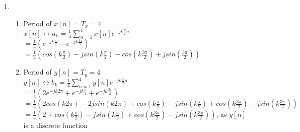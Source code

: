 \documentclass[10pt,a4paper, margin=1in]{article}
\begin{document}
\begin{enumerate}
\item %
    \begin{enumerate}
    \item %
    Period of $x[n] = T_x = 4$ \vspace{0.2cm}\\
    $x[n] \longleftrightarrow a_k = \frac{1}{4}\sum^4_{n=1}x[n]e^{-jk\frac{\pi}{2}n}$ \vspace{0.2cm}\\
    \hspace*{1.9cm}$=\frac{1}{4}(e^{-jk\frac{\pi}{2}}-e^{-jk\frac{3\pi}{2}})$ \vspace{0.2cm}\\
    \hspace*{1.9cm}$=\frac{1}{4}(cos(k\frac{\pi}{2})-jsin(k\frac{\pi}{2})-cos(k\frac{3\pi}{2})+jsin(\frac{3\pi}{2}))$\vspace{0.2cm}\\
    
    \item %
    Period of $y[n] = T_y = 4$ \vspace{0.2cm}\\
    $y[n] \longleftrightarrow b_k = \frac{1}{4}\sum^4_{n=1}y[n]e^{-jk\frac{\pi}{2}n}$ \vspace{0.2cm}\\
    \hspace*{1.9cm}$=\frac{1}{4}(2e^{-jk2\pi}+e^{-jk\frac{\pi}{2}}+e^{-jk\frac{3\pi}{2}})$ \vspace{0.2cm}\\
    \hspace*{1.9cm}$=\frac{1}{4}(2cos(k2\pi)-2jsin(k2\pi)+cos(k\frac{\pi}{2})-jsin(k\frac{\pi}{2})+cos(k\frac{3\pi}{2})-jsin(k\frac{3\pi}{2}))$ \vspace{0.2cm}\\
    \hspace*{1.9cm}$=\frac{1}{4}(2+cos(k\frac{\pi}{2})-jsin(k\frac{\pi}{2})+cos(k\frac{3\pi}{2})-jsin(k\frac{3\pi}{2}))$, as $y[n]$ is a discrete function \vspace{0.2cm}\\
    

\end{enumerate}
\end{enumerate}
\end{document}
